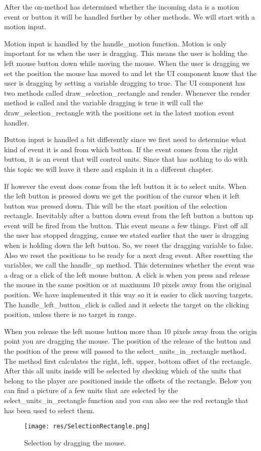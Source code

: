 After the on-method has determined whether the incoming data is a motion event or button it will be handled further by other methods. We will start with a motion input.

Motion input is handled by the handle\_motion function. Motion is only important for us when the user is dragging. This means the user is holding the left mouse button down while moving the mouse. When the user is dragging we set the position the mouse has moved to and let the UI component know that the user is dragging by setting a variable dragging to true. The UI component has two methods called draw\_selection\_rectangle and render. Whenever the render method is called and the variable dragging is true it will call the draw\_selection\_rectangle with the positions set in the latest motion event handler.

Button input is handled a bit differently since we first need to determine what kind of event it is and from which button. If the event comes from the right button, it is an event that will control units. Since that has nothing to do with this topic we will leave it there and explain it in a different chapter. 

If however the event does come from the left button it is to select units. When the left button is pressed down we get the position of the cursor when it left button was pressed down. This will be the start position of the selection rectangle. Inevitably after a button down event from the left button a button up event will be fired from the button. This event means a few things. First off all the user has stopped dragging, cause we stated earlier that the user is dragging when is holding down the left button. So, we reset the dragging variable to false. Also we reset the positions to be ready for a next drag event. After resetting the variables, we call the handle\_up method. This determines whether the event was a drag or a click of the left mouse button. A click is when you press and release the mouse in the same position or at maximum 10 pixels away from the original position. We have implemented it this way so it is easier to click moving targets. The handle\_left\_button\_click is called and it selects the target on the clicking position, unless there is no target in range.

When you release the left mouse button more than 10 pixels away from the origin point you are dragging the mouse. The position of the release of the button and the position of the press will passed to the select\_units\_in\_rectangle method. The method first calculates the right, left, upper, bottom offset of the rectangle. After this all units inside will be selected by checking which of the units that belong to the player are positioned inside the offsets of the rectangle. Below you can find a picture of a few units that are selected by the select\_units\_in\_rectangle function and you can also see the red rectangle that has been used to select them. 

\begin{figure}[H]
    \centering
    \texttt{[image: res/SelectionRectangle.png]}
    \caption{Selection by dragging the mouse.}
\end{figure}
\newpage

